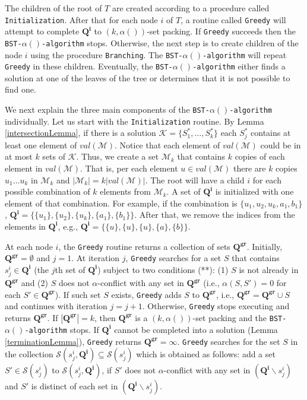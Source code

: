 The children of the root of $T$ are created according to a procedure called \texttt{Initialization}. After that for each node $i$ of $T$, a routine called \texttt{Greedy} will attempt to complete $\mathbf{Q^i}$ to $(k,\alpha())$-set packing. If \texttt{Greedy} succeeds then the \texttt{BST-$\alpha()$-algorithm} stops. Otherwise, the next step is to create children of the node $i$ using the procedure \texttt{Branching}. The \texttt{BST-$\alpha()$-algorithm} will repeat \texttt{Greedy} in these children. 
Eventually, the \texttt{BST-$\alpha()$-algorithm} either finds a solution at one of the leaves of the tree or determines that it is not possible to find one. 

We next explain the three main components of the \texttt{BST-$\alpha()$-algorithm} individually. Let us start with the \texttt{Initialization} routine. By Lemma \ref{intersectionLemma}, if there is a solution $\mathcal{K}=\{S^*_1,\dots,S^*_k\}$ each $S^*_j$ contains at least one element of $val(\mathcal{M})$. 
Notice that each element of $val(\mathcal{M})$ could be in at most $k$ sets of $\mathcal{K}$. 
Thus, we create a set $\mathcal{M}_k$ that contains $k$ copies of each element in $val(\mathcal{M})$. That is, per each element $u \in val(\mathcal{M})$ there are $k$ copies $u_1 \dots u_k$ in $\mathcal{M}_k$ and $|\mathcal{M}_k| = k |val(\mathcal{M})|$. The root will have a child $i$ for each possible combination of $k$ elements from $\mathcal{M}_k$. A set of $\mathbf{Q^i}$ is initialized with one element of that combination. For example, if the combination is $\{u_1,u_2,u_k,a_1,b_1\}$, $\mathbf{Q^i}=\{\{u_1\},\{u_2\},\{u_k\},\{a_1\},\{b_1\}\}$. After that, we remove the indices from the elements in $\mathbf{Q^i}$, e.g., $\mathbf{Q^i}=\{\{u\},\{u\},\{u\},\{a\},\{b\}\}$. 

At each node $i$, the \texttt{Greedy} routine returns a collection of sets $\mathbf{Q^{gr}}$. 
Initially, $\mathbf{Q^{gr}} = \emptyset$ and $j=1$. 
At iteration $j$, \texttt{Greedy} searches for a set $S$ that contains $s^i_j \in \mathbf{Q^i}$ (the $j$th set of $\mathbf{Q^i}$) subject to two conditions (**): (1) $S$ is not already in $\mathbf{Q^{gr}}$ and (2) $S$ does not $\alpha$-conflict with any set in $\mathbf{Q^{gr}}$ (i.e., $\alpha(S,S')=0$ for each $S' \in \mathbf{Q^{gr}}$). 
If such set $S$ exists, \texttt{Greedy} adds $S$ to $\mathbf{Q^{gr}}$, i.e., $\mathbf{Q^{gr}} = \mathbf{Q^{gr}} \cup S$ and  continues with iteration $j=j+1$. 
Otherwise, \texttt{Greedy} stops executing and returns $\mathbf{Q^{gr}}$.
If $|\mathbf{Q^{gr}}|=k$, then $\mathbf{Q^{gr}}$ is a $(k,\alpha())$-set packing and the \texttt{BST-$\alpha()$-algorithm} stops.
If $\mathbf{Q^i}$ cannot be completed into a solution (Lemma \ref{terminationLemma}), \texttt{Greedy} returns $\mathbf{Q^{gr}} = \infty$.
\texttt{Greedy} searches for the set $S$ in the collection $\mathcal{S}(s^i_j,\mathbf{Q^i}) \subseteq \mathcal{S}(s^i_j)$ which is obtained as follows: add a set $S' \in \mathcal{S}(s^i_j)$ to $\mathcal{S}(s^i_j,\mathbf{Q^i})$, if $S'$ does not $\alpha$-conflict with any set in $(\mathbf{Q^i} \backslash s^i_j)$ and $S'$ is distinct of each set in $(\mathbf{Q^i} \backslash s^i_j)$.


